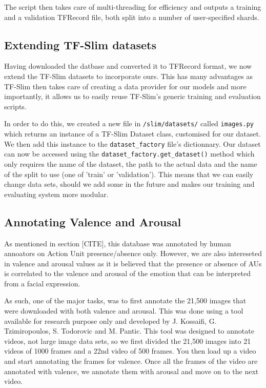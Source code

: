 \documentclass[12pt,twoside]{article}
\begin{document}
The script then takes care of multi-threading for efficiency and outputs a training and a validation TFRecord file, both split into a number of user-specified shards.

\subsection{Extending TF-Slim datasets}

Having downloaded the datbase and converted it to TFRecord format, we now
extend the TF-Slim datasets to incorporate ours. This has many advantages as
TF-Slim then takes care of creating a data provider for our models and more
importantly, it allows us to easily reuse TF-Slim's generic training and
evaluation scripts.

In order to do this, we created a new file in \texttt{/slim/datasets/} called \texttt{images.py} 
which returns an instance of a TF-Slim Dataset class, customised for our dataset. 
We then add this instance to the \texttt{dataset\_factory} file's dictionnary.
Our dataset can now be accessed using the
\texttt{dataset\_factory.get\_dataset()} method which only requires the name of
the dataset, the path to the actual data and the name of the split to use (one
of 'train' or 'validation'). This means that we can easily change data sets,
should we add some in the future and makes our training and evaluating system
more modular.

\subsection{Annotating Valence and Arousal}

As mentioned in section [CITE], this database was annotated by human annoators
on Action Unit presence/absence only. However, we are also intereseted in
valence and arousal values as it is believed that the presence or absence of
AUs is correlated to the valence and arousal of the emotion that can be
interpreted from a facial expression.

As such, one of the major tasks, was to first annotate the 21,500 images that
were downloaded with both valence and arousal. This was done using a tool
available for research purpose only and developed by J. Kossaifi, 
G. Tzimiropoulos, S. Todorovic and M. Pantic. This tool was designed to
annotate videos, not large image data sets, so we first divided the 21,500
images into 21 videos of 1000 frames and a 22nd video of 500 frames. You then
load up a video and start annotating the frames for valence. Once all the
frames of the video are annotated with valence, we annotate them with arousal
and move on to the next video.
\end{document}
